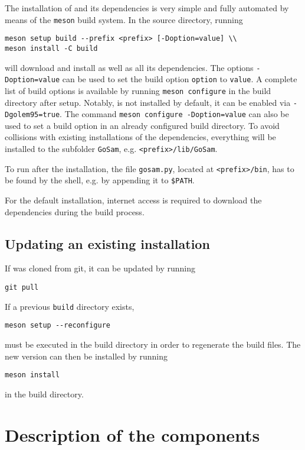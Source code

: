 The installation of \gosam and its dependencies is very simple and fully automated by means of the \texttt{meson}
build system. In the \gosam source directory, running
\begin{lstlisting}[style=sh]
meson setup build --prefix <prefix> [-Doption=value] \\
meson install -C build
\end{lstlisting}
will download and install \gosam as well as all its dependencies. The options \texttt{-Doption=value} can
be used to set the build option \texttt{option} to \texttt{value}. A complete list of build options is available by
running \texttt{meson configure} in the build directory after
setup. Notably, \golemVC is not installed by default, it can be
enabled via \texttt{-Dgolem95=true}. The command \texttt{meson configure -Doption=value} can also
be used to set a build option in an already configured build directory. To avoid collisions with existing
installations of the dependencies, everything will be installed to the subfolder \texttt{GoSam},
e.g. \texttt{<prefix>/lib/GoSam}.

To run \gosam after the installation, the file \texttt{gosam.py}, located at \texttt{<prefix>/bin}, has to be found by the shell, e.g. by appending it to \texttt{\$PATH}.

For the default installation, internet access is required to download the dependencies during the build process.

\subsection{Updating an existing installation}

If \gosam was cloned from git, it can be updated by running
\begin{lstlisting}[style=sh]
git pull
\end{lstlisting}
If a previous \texttt{build} directory exists, 
\begin{lstlisting}[style=sh]
meson setup --reconfigure
\end{lstlisting}
must be executed in the build directory in order to regenerate the build files. The new version can then be installed by running
\begin{lstlisting}[style=sh]
meson install
\end{lstlisting}
in the build directory.

\section{Description of the components}



